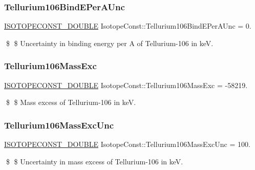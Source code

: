 \subsubsection{\texorpdfstring{Tellurium106\+Bind\+E\+Per\+A\+Unc}{Tellurium106BindEPerAUnc}}
{\footnotesize\ttfamily \mbox{\hyperlink{group___isotope_const-_macros_ga8f45a7272ce02c0b4c65c44636ed719a}{I\+S\+O\+T\+O\+P\+E\+C\+O\+N\+S\+T\+\_\+\+D\+O\+U\+B\+LE}} Isotope\+Const\+::\+Tellurium106\+Bind\+E\+Per\+A\+Unc = 0.}

\$ \$ Uncertainty in binding energy per A of Tellurium-\/106 in keV. \mbox{\label{group___isotope_const-_tellurium-_te106_gaa2be6aefe1805423473bbc9247507ad5}} 
\subsubsection{\texorpdfstring{Tellurium106\+Mass\+Exc}{Tellurium106MassExc}}
{\footnotesize\ttfamily \mbox{\hyperlink{group___isotope_const-_macros_ga8f45a7272ce02c0b4c65c44636ed719a}{I\+S\+O\+T\+O\+P\+E\+C\+O\+N\+S\+T\+\_\+\+D\+O\+U\+B\+LE}} Isotope\+Const\+::\+Tellurium106\+Mass\+Exc = -\/58219.}

\$ \$ Mass excess of Tellurium-\/106 in keV. \mbox{\label{group___isotope_const-_tellurium-_te106_ga1a417dbf61d7e17dea8496dfd1f48153}} 
\subsubsection{\texorpdfstring{Tellurium106\+Mass\+Exc\+Unc}{Tellurium106MassExcUnc}}
{\footnotesize\ttfamily \mbox{\hyperlink{group___isotope_const-_macros_ga8f45a7272ce02c0b4c65c44636ed719a}{I\+S\+O\+T\+O\+P\+E\+C\+O\+N\+S\+T\+\_\+\+D\+O\+U\+B\+LE}} Isotope\+Const\+::\+Tellurium106\+Mass\+Exc\+Unc = 100.}

\$ \$ Uncertainty in mass excess of Tellurium-\/106 in keV. \mbox{\label{group___isotope_const-_tellurium-_te106_ga340d9bd1e86735c63dcff05eab936361}} 
